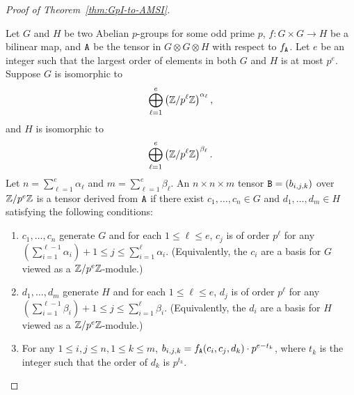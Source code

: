 \begin{proof}[Proof of Theorem~\ref{thm:GpI-to-AMSI}]
\begin{definition}\label{def:tensor_from_group}
Let $G$ and $H$ be two Abelian $p$-groups for some odd prime $p$, 
$f: G \times G \rightarrow H$ be a bilinear map, and $\mathtt{A}$ be the tensor in $G \otimes G\otimes H$ with respect to $f_{\mathtt{A}}$. 
Let $e$ be an integer such that the largest order of elements in both $G$ and $H$ is at most $p^e$. 
Suppose $G$ is isomorphic to 
\[\bigoplus_{\ell = 1}^{e} \left(\mathbb{Z} / p^{\ell } \mathbb{Z}\right)^{\alpha_\ell},\]
and $H$ is isomorphic to 
\[\bigoplus_{\ell = 1}^{e} \left(\mathbb{Z} / p^{\ell } \mathbb{Z}\right)^{\beta_\ell}.\]
Let $n = \sum_{\ell = 1}^{e} \alpha_\ell$ and $m = \sum_{\ell = 1}^{e} \beta_\ell $. 
An $n \times n \times m$ tensor $\mathtt{B} = (b_{i, j, k})$ over $\mathbb{Z} / p^e \mathbb{Z}$ is a tensor derived from $\mathtt{A}$ if there exist
$c_1, \dots, c_n \in G$ and $d_1, \dots, d_m \in H$ satisfying the following conditions:
\begin{enumerate}
\item $c_1, \dots, c_n$ generate $G$ and for each $1 \leq \ell \leq e$, $c_{j}$ is of order $p^\ell$ for any $(\sum_{i = 1}^{\ell - 1} \alpha_i) + 1 \leq j \leq \sum_{i = 1}^{\ell} \alpha_i$. (Equivalently, the $c_i$ are a basis for $G$ viewed as a $\mathbb{Z}/p^e \mathbb{Z}$-module.)
\item $d_1, \dots, d_m$ generate $H$ and for each $1 \leq \ell \leq e$, $d_{j}$ is of order $p^\ell$ for any $(\sum_{i = 1}^{\ell - 1} \beta_i) + 1 \leq j \leq \sum_{i = 1}^{\ell} \beta_i$. (Equivalently, the $d_i$ are a basis for $H$ viewed as a $\mathbb{Z}/p^e \mathbb{Z}$-module.)
\item For any $1 \leq i, j \leq n, 1 \leq k \leq m$, $b_{i, j, k} = f_{\mathtt{A}}(c_i, c_j, d_k)\cdot p^{e - t_k}$, where $t_k$ is the integer such that the order of $d_k$ is $p^{t_k}$.%
\end{enumerate}








\end{definition}
\end{proof}

